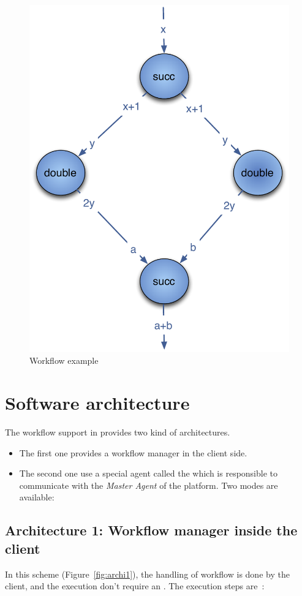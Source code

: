 \begin{figure}[htbp]
  \centering
  \includegraphics[keepaspectratio,width=0.4\linewidth]{fig/wf_example1}
  \caption{Workflow example}
  \label{fig:example1}
\end{figure}

\section{Software architecture}

The workflow support in \diet provides two kind of architectures. 

\begin{itemize}
   \item The first one provides a workflow manager in the client side.
   \item The second one use a special agent called the \madag which is
     responsible to communicate with the \textit{Master Agent} of the
     platform. Two modes are available:
\end{itemize}

\subsection{Architecture 1: Workflow manager inside the client}
\label{sec:archi1}

In this scheme (Figure~\ref{fig:archi1}), the handling of workflow is
done by the client, and the execution don't require an \madag. The
execution steps are~:


